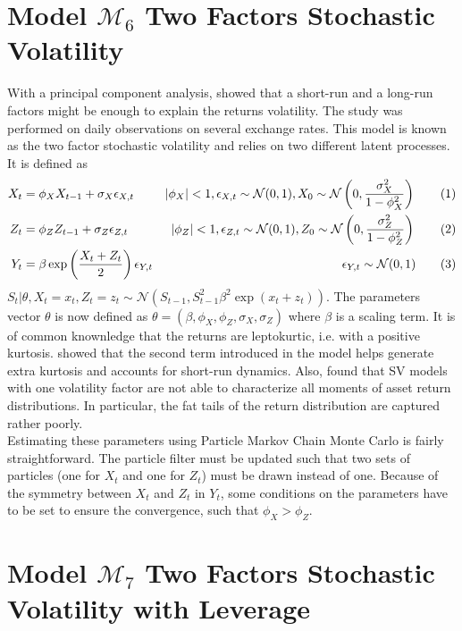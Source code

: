 \documentclass[11pt,a4,twosided,singlespacing,titlepagenumber=on]{scrreprt}
\numberwithin{equation}{chapter} %
\theoremstyle{remark}
\newcommand\numberthis{\addtocounter{equation}{1}\tag{\theequation}}
\begin{document}
\section{Model $\mathcal{M}_6$ Two Factors Stochastic Volatility}
With a principal component analysis, \cite{harvey1994} showed that a short-run and a long-run factors might be enough to explain the returns volatility. The study was performed on daily observations on several exchange rates. This model is known as the two factor stochastic volatility and relies on two different latent processes. It is defined as
\begin{align*}
  X_t 						&=  \phi_X X_{t-1} + \sigma_X \epsilon_{X,t} &|\phi_X| < 1, \epsilon_{X,t} \sim \mathcal{N}(0,1), X_0 \sim \mathcal{N} \left(0, \frac{\sigma_X^2}{1 - \phi_X^2} \right) \numberthis \label{tfsv_process_X} \\
  Z_t 						&=  \phi_Z Z_{t-1} + \sigma_Z \epsilon_{Z,t} &|\phi_Z| < 1, \epsilon_{Z,t} \sim \mathcal{N}(0,1), Z_0 \sim \mathcal{N} \left(0, \frac{\sigma_Z^2}{1 - \phi_Z^2} \right) \numberthis\\
  Y_t 						&=  \beta \exp \left( \frac{X_t+Z_t}{2} \right) \epsilon_{Y,t} &\epsilon_{Y,t} \sim \mathcal{N}(0,1) \numberthis
\end{align*}
$S_t | \theta, X_t = x_t, Z_t = z_t \sim \mathcal{N}\left(S_{t-1}, S_{t-1}^2 \beta^2 \exp \left(x_t + z_t\right) \right)$. The parameters vector $\theta$ is now defined as $\theta = (\beta, \phi_X, \phi_Z, \sigma_X, \sigma_Z)$ where $\beta$ is a scaling term. It is of common knownledge that the returns are leptokurtic, i.e. with a positive kurtosis. \cite{veiga2006} showed that the second term introduced in the model helps generate extra kurtosis and accounts for short-run dynamics. Also, \cite{chernov2000} found that SV models with one volatility factor are not able to characterize all moments of asset return distributions. In particular, the fat tails of the return distribution are captured rather poorly. \\

Estimating these parameters using Particle Markov Chain Monte Carlo is fairly straightforward. The particle filter must be updated such that two sets of particles (one for $X_t$ and one for $Z_t$) must be drawn instead of one. Because of the symmetry between $X_t$ and $Z_t$ in $Y_t$, some conditions on the parameters have to be set to ensure the convergence, such that $\phi_X > \phi_Z$.

\section{Model $\mathcal{M}_7$ Two Factors Stochastic Volatility with Leverage}
\end{document}
